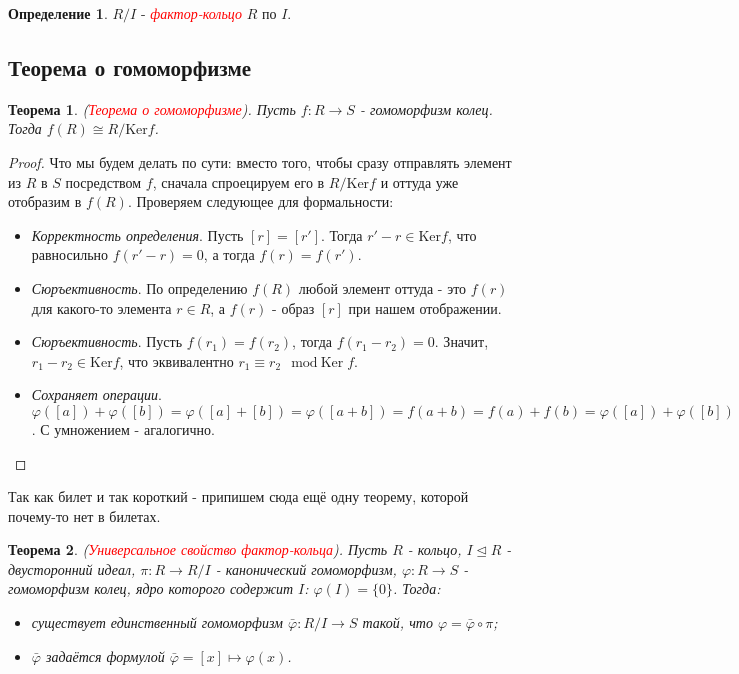 \documentclass[a4paper,100pt]{article}
\theoremstyle{indented}
\newtheorem{theorem}{Теорема}
\theoremstyle{definition}
\newtheorem{defn}{Определение}
\theoremstyle{remark}
\begin{document}
\begin{defn}
    $R/I$ - \hypertarget{n24}{\textcolor{red}{\textit{фактор-кольцо}}} $R$ по $I$.
\end{defn}

\resetall

\subsection{Теорема о гомоморфизме}

\begin{theorem}
    (\hypertarget{n25}{\textcolor{red}{\textit{Теорема о гомоморфизме}}}). Пусть $f:R\rightarrow S$ - гомоморфизм колец. Тогда $f(R)\cong R/\text{Ker}f$.
\end{theorem}

\begin{proof}
    Что мы будем делать по сути: вместо того, чтобы сразу отправлять элемент из $R$ в $S$ посредством $f$, сначала спроецируем его в $R/\text{Ker} f$ и оттуда уже отобразим в $f(R)$. Проверяем следующее для формальности:\ 

    \begin{itemize}
        \item \textit{Корректность определения}. Пусть $[r]=[r']$. Тогда $r'-r\in \text{Ker} f$, что равносильно $f(r'-r)=0$, а тогда $f(r)=f(r')$.
        \item \textit{Сюръективность}. По определению $f(R)$ любой элемент оттуда - это $f(r)$ для какого-то элемента $r\in R$, а $f(r)$ - образ $[r]$ при нашем отображении.
        \item \textit{Сюръективность}. Пусть $f(r_1)=f(r_2)$, тогда $f(r_1-r_2)=0$. Значит, $r_1-r_2\in \text{Ker} f$, что эквивалентно $r_1\equiv r_2 \mod \text{Ker} f$.
        \item \textit{Сохраняет операции}. $\varphi([a])+\varphi([b])=\varphi([a]+[b])=\varphi([a+b])=f(a+b)=f(a)+f(b)=\varphi([a])+\varphi([b])$. С умножением - агалогично.
    \end{itemize}
\end{proof}

Так как билет и так короткий - припишем сюда ещё одну теорему, которой почему-то нет в билетах.\\

\begin{theorem}
    (\hypertarget{n26}{\textcolor{red}{\textit{Универсальное свойство фактор-кольца}}}). Пусть $R$ - кольцо, $I\trianglelefteq R$ - двусторонний идеал, $\pi: R\rightarrow R/I$ - канонический гомоморфизм, $\varphi: R\rightarrow S$ - гомоморфизм колец, ядро которого содержит $I$: $\varphi(I)=\{0\}$. Тогда:\

    \begin{itemize}
        \item существует единственный гомоморфизм $\bar{\varphi}:R/I\rightarrow S$ такой, что $\varphi=\bar{\varphi}\circ \pi$;
        \item $\bar{\varphi}$ задаётся формулой $\bar{\varphi}=[x]\mapsto \varphi(x)$.
    \end{itemize}
\end{theorem}
\end{document}
